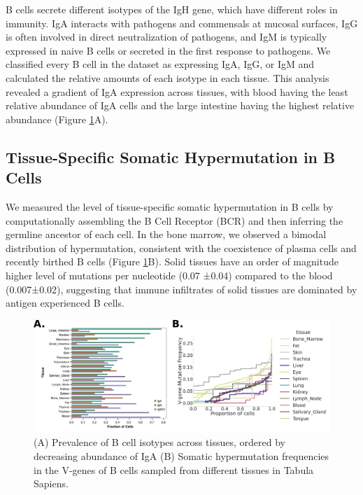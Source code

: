 B cells secrete different isotypes of the IgH gene, which have different roles in immunity. IgA interacts with pathogens and commensals at mucosal surfaces, IgG is often involved in direct neutralization of pathogens, and IgM is typically expressed in naive B cells or secreted in the first response to pathogens. We classified every B cell in the dataset as expressing IgA, IgG, or IgM and calculated the relative amounts of each isotype in each tissue. This analysis revealed a gradient of IgA expression across tissues, with blood having the least relative abundance of IgA cells and the large intestine having the highest relative abundance (Figure \ref{fig:TabulaSapiens_igh}A).

\subsection{Tissue-Specific Somatic Hypermutation in B Cells}

We measured the level of tissue-specific somatic hypermutation in B cells by computationally assembling the B Cell Receptor (BCR) and then inferring the germline ancestor of each cell\cite{lindeman2018bracer,gupta2015change}. In the bone marrow, we observed a bimodal distribution of hypermutation, consistent with the coexistence of plasma cells and recently birthed B cells (Figure \ref{fig:TabulaSapiens_igh}B). Solid tissues have an order of magnitude higher level of mutations per nucleotide (0.07 ±0.04) compared to the blood (0.007±0.02), suggesting that immune infiltrates of solid tissues are dominated by antigen experienced B cells.

\begin{figure}[hbt!]
\centering
\includegraphics[width=14cm, keepaspectratio]{figs/TabulaSapiens/fig3_tabula_igh.png}
\caption[Tissue population-level parameters of B cell Dynamics.]{(A) Prevalence of B cell isotypes across tissues, ordered by decreasing abundance of IgA (B) Somatic hypermutation frequencies in the V-genes of B cells sampled from different tissues in
Tabula Sapiens.}
\label{fig:TabulaSapiens_igh}
\end{figure}


